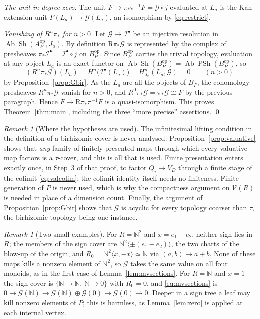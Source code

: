 \documentclass[12pt]{article}
\newcommand{\N}{\mathbb N}
\newcommand{\Sh}{\operatorname{Sh}}
\newcommand{\PSh}{\operatorname{PSh}}
\newcommand{\Ab}{\operatorname{Ab}}
\newcommand{\R}{\mathrm R}
\newcommand{\Jb}{J_{\mathrm b}}
\newcommand{\G}{\mathcal G}
\newcommand{\I}{\mathcal I}
\newcommand{\V}{\mathcal V}
\theoremstyle{definition}
\theoremstyle{remark}
\newtheorem{remark}[theorem]{Remark}
\begin{document}
\emph{The unit in degree zero.}  The unit \(F\to\pi_*\pi^{-1}F=\G\circ j\)
evaluated at \(L_a\) is the Kan extension unit \(F(L_a)\to\G(L_a)\), an
isomorphism by \eqref{eq:restrict}.

\emph{Vanishing of \(R^n\pi_*\) for \(n>0\).}  Let \(\G\to\I^\bullet\) be an
injective resolution in \(\Ab\Sh(A_P^{\mathrm{op}},\Jb)\).  By definition
\(\R\pi_*\G\) is represented by the complex of presheaves
\(\pi_*\I^\bullet=\I^\bullet\circ j\) on \(B_P^{\mathrm{op}}\).  Since
\(B_P^{\mathrm{op}}\) carries the trivial topology, evaluation at any object
\(L_a\) is an exact functor on \(\Ab\Sh(B_P^{\mathrm{op}})=\Ab\PSh(B_P^{\mathrm{op}})\),
so
\[
             (R^n\pi_*\G)(L_a)=H^n\bigl(\I^\bullet(L_a)\bigr)
             =H^n_{\Jb}(L_a,\G)=0
                                      \qquad(n>0)
\]
by Proposition~\ref{prop:Gbir}.  As the \(L_a\) are all the objects of
\(B_P\), the cohomology presheaves \(R^n\pi_*\G\) vanish for \(n>0\), and
\(R^0\pi_*\G=\pi_*\G\cong F\) by the previous paragraph.  Hence
\(F\to\R\pi_*\pi^{-1}F\) is a quasi-isomorphism.  This proves
Theorem~\ref{thm:main}, including the three ``more precise'' assertions.
\qed

\begin{remark}[Where the hypotheses are used]\label{rem:infinitesimal}
The infinitesimal lifting condition in the definition of a birhizomic cover
is never analysed: Proposition~\ref{prop:valuative} shows that \emph{any}
family of finitely presented maps through which every valuative map
factors is a \(\tau\)-cover, and this is all that is used.  Finite
presentation enters exactly once, in Step~3 of that proof, to factor
\(Q_i\to V_D\) through a finite stage of the colimit \eqref{eq:valcolim};
the colimit identity itself needs no finiteness.  Finite generation of
\(P\) is never used, which is why the compactness argument on \(\V(R)\) is
needed in place of a dimension count.  Finally, the argument of
Proposition~\ref{prop:Gbir} shows that \(\G\) is acyclic for every topology
coarser than \(\tau\), the birhizomic topology being one instance.
\end{remark}

\begin{remark}[Two small examples]
For \(R=\N^2\) and \(x=e_1-e_2\), neither sign lies in \(R\); the members
of the sign cover are \(\N^2\langle\pm(e_1-e_2)\rangle\), the two charts of
the blow-up of the origin, and \(R_0=\N^2\langle x,-x\rangle\simeq\N\) via
\((a,b)\mapsto a+b\).  None of these maps kills a nonzero element of
\(\N^2\), so \(\G\) takes the same value on all four monoids, as in the first
case of Lemma~\ref{lem:mvsections}.  For \(R=\N\) and \(x=1\) the sign
cover is \(\{\N\to\N,\ \N\to0\}\) with \(R_0=0\), and
\eqref{eq:mvsections} is \(0\to\G(\N)\to\G(\N)\oplus\G(0)\to\G(0)\to0\).
Deeper in a sign tree a leaf may kill nonzero elements of \(P\); this is
harmless, as Lemma~\ref{lem:zero} is applied at each internal vertex.
\end{remark}
\end{document}

